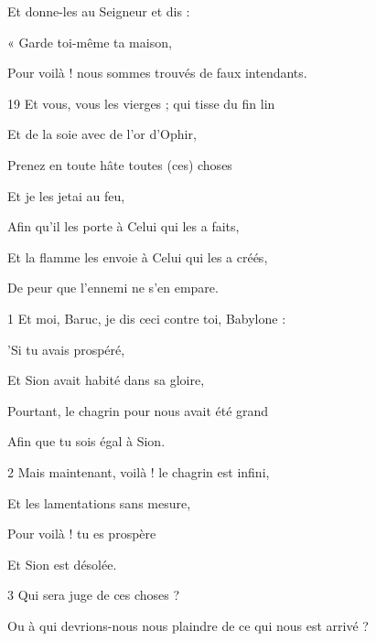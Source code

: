 \par Et donne-les au Seigneur et dis :

\par « Garde toi-même ta maison,

\par Pour voilà ! nous sommes trouvés de faux intendants.

\par 19 Et vous, vous les vierges ; qui tisse du fin lin

\par Et de la soie avec de l'or d'Ophir,

\par Prenez en toute hâte toutes (ces) choses

\par Et je les jetai au feu,

\par Afin qu'il les porte à Celui qui les a faits,

\par Et la flamme les envoie à Celui qui les a créés,

\par De peur que l'ennemi ne s'en empare.


\par 1 Et moi, Baruc, je dis ceci contre toi, Babylone :

\par 'Si tu avais prospéré,

\par Et Sion avait habité dans sa gloire,

\par Pourtant, le chagrin pour nous avait été grand

\par Afin que tu sois égal à Sion.

\par 2 Mais maintenant, voilà ! le chagrin est infini,

\par Et les lamentations sans mesure,

\par Pour voilà ! tu es prospère

\par Et Sion est désolée.

\par 3 Qui sera juge de ces choses ?

\par Ou à qui devrions-nous nous plaindre de ce qui nous est arrivé ?

